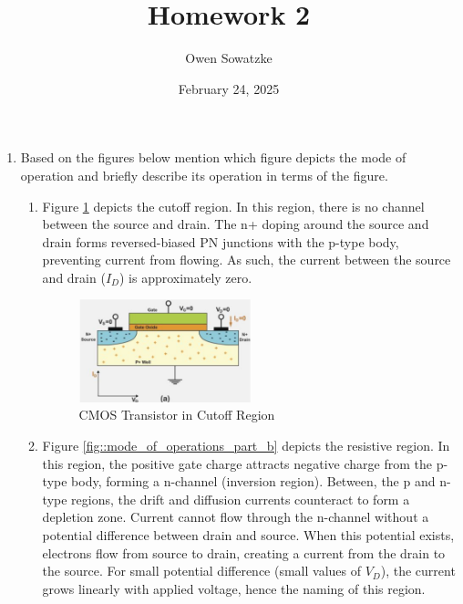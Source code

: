 \documentclass[fleqn]{article}
\title{Homework 2}
\author{Owen Sowatzke}
\date{February 24, 2025}
\newcommand{\zerodisplayskip}{
	\setlength{\abovedisplayskip}{0pt}%
	\setlength{\belowdisplayskip}{0pt}%
	\setlength{\abovedisplayshortskip}{0pt}%
	\setlength{\belowdisplayshortskip}{0pt}%
	\setlength{\mathindent}{0pt}}
\begin{document}
	\offinterlineskip
	\setlength{\lineskip}{12pt}
	\zerodisplayskip
	\maketitle
	
	\begin{enumerate}
		\item Based on the figures below mention which figure depicts the mode of operation and briefly describe its operation in terms of the figure.
		
		\begin{enumerate}
		
			\item Figure \ref{fig::mode_of_operations_part_a} depicts the cutoff region. In this region, there is no channel between the source and drain. The n+ doping around the source and drain forms reversed-biased PN junctions with the p-type body, preventing current from flowing. As such, the current between the source and drain ($I_{D}$) is approximately zero.
			
			\begin{figure}[H]				
				\centerline{\includegraphics[width=0.5\textwidth]{mode_of_operations_part_a.png}}
				\caption{CMOS Transistor in Cutoff Region}
				\label{fig::mode_of_operations_part_a}
			\end{figure}
		
			\item Figure \ref{fig::mode_of_operations_part_b} depicts the resistive region. In this region, the positive gate charge attracts negative charge from the p-type body, forming a n-channel (inversion region). Between, the p and n-type regions, the drift and diffusion currents counteract to form a depletion zone. Current cannot flow through the n-channel without a potential difference between drain and source. When this potential exists, electrons flow from source to drain, creating a current from the drain to the source. For small potential difference (small values of $V_D$), the current grows linearly with applied voltage, hence the naming of this region.
			

\end{enumerate}
\end{enumerate}
\end{document}
